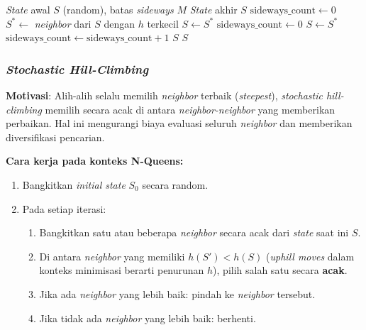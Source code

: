 \documentclass[12pt,a4paper]{article}
\begin{document}
\begin{algorithm}[H]
\caption{Hill-Climbing dengan \textit{Sideways Move} untuk N-Queens}
\label{alg:sideways-hc}
\begin{algorithmic}[1]
\Require \textit{State} awal $S$ (random), batas \textit{sideways} $M$
\Ensure \textit{State} akhir $S$
\State $\text{sideways\_count} \leftarrow 0$
\Repeat
    \State $S^* \leftarrow$ \textit{neighbor} dari $S$ dengan $h$ terkecil
        \State $S \leftarrow S^*$
        \State $\text{sideways\_count} \leftarrow 0$
        \State $S \leftarrow S^*$
        \State $\text{sideways\_count} \leftarrow \text{sideways\_count} + 1$
    \Else
        \State \Return $S$
    \EndIf
{}
\State \Return $S$
\end{algorithmic}
\end{algorithm}

\subsubsection{\textit{Stochastic Hill-Climbing}}
\label{subsubsec:stochastic}

\textbf{Motivasi}: Alih-alih selalu memilih \textit{neighbor} terbaik (\textit{steepest}), \textit{stochastic hill-climbing} memilih secara acak di antara \textit{neighbor-neighbor} yang memberikan perbaikan. Hal ini mengurangi biaya evaluasi seluruh \textit{neighbor} dan memberikan diversifikasi pencarian.

\textbf{Cara kerja pada konteks N-Queens:}
\begin{enumerate}[label=\arabic*.]
    \item Bangkitkan \textit{initial state} $S_0$ secara random.
    \item Pada setiap iterasi:
    \begin{enumerate}[label=\alph*.]
        \item Bangkitkan satu atau beberapa \textit{neighbor} secara acak dari \textit{state} saat ini $S$.
        \item Di antara \textit{neighbor} yang memiliki $h(S') < h(S)$ (\textit{uphill moves} dalam konteks minimisasi berarti penurunan $h$), pilih salah satu secara \textbf{acak}.
        \item Jika ada \textit{neighbor} yang lebih baik: pindah ke \textit{neighbor} tersebut.
        \item Jika tidak ada \textit{neighbor} yang lebih baik: berhenti.
    \end{enumerate}
\end{enumerate}
\end{document}
